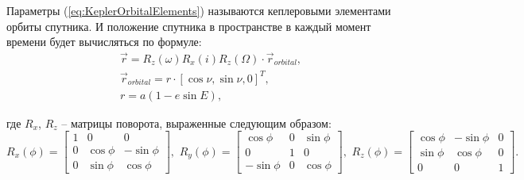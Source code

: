 Параметры (\ref{eq:KeplerOrbitalElements}) называются кеплеровыми элементами
орбиты спутника.
И положение спутника в пространстве в каждый момент времени будет вычисляться по формуле:
\begin{equation}
  \begin{aligned}
    & \vec{r} = R_z(\omega)R_x(i)R_z(\Omega) \cdot \vec{r}_{orbital}, \\
    & \vec{r}_{orbital} = r \cdot [\cos\nu, \sin\nu, 0]^{T}, \\
    & r = a(1 - e\sin E),
  \end{aligned}
\end{equation}\par
где $R_x$, $R_z$ -- матрицы поворота, выраженные следующим образом:
\begin{equation}
    R_x(\phi) = \begin{bmatrix}
       1        &  0        &   0        \\
       0        &  \cos\phi &  -\sin\phi \\
       0        &  \sin\phi &   \cos\phi
    \end{bmatrix},\,\,
    R_y(\phi) = \begin{bmatrix}
       \cos\phi &  0        &  \sin\phi \\
       0        &  1        &  0        \\
      -\sin\phi &  0        &  \cos\phi
    \end{bmatrix},\,\,
    R_z(\phi) = \begin{bmatrix}
      \cos\phi & -\sin\phi & 0 \\
      \sin\phi &  \cos\phi & 0 \\
      0        &  0        & 1
    \end{bmatrix}.
\end{equation}


